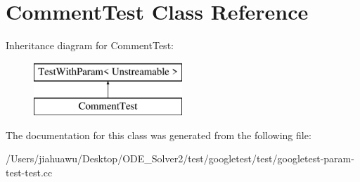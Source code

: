 \hypertarget{class_comment_test}{}\section{Comment\+Test Class Reference}
\label{class_comment_test}
Inheritance diagram for Comment\+Test\+:\begin{figure}[H]
\begin{center}
\leavevmode
\includegraphics[height=2.000000cm]{class_comment_test}
\end{center}
\end{figure}


The documentation for this class was generated from the following file\+:\begin{DoxyCompactItemize}
\item 
/\+Users/jiahuawu/\+Desktop/\+O\+D\+E\+\_\+\+Solver2/test/googletest/test/googletest-\/param-\/test-\/test.\+cc\end{DoxyCompactItemize}
